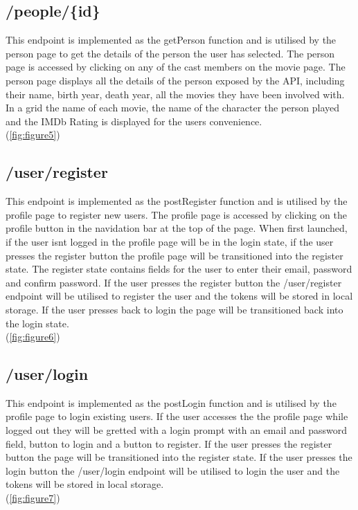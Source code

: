 \documentclass[12pt,a4paper]{article}
\begin{document}
		\subsection{/people/\{id\}}
			This endpoint is implemented as the getPerson function and is utilised by the person page 
			to get the details of the person the user has selected. The person page is accessed by 
			clicking on any of the cast members on the movie page. The person page displays all the 
			details of the person exposed by the API, including their name, birth year, death year, 
			all the movies they have been involved with. In a grid the name of each movie, the name 
			of the character the person played and the IMDb Rating is displayed for the users 
			convenience.\\
			(\cref{fig:figure5})

		\subsection{/user/register}
			This endpoint is implemented as the postRegister function and is utilised by the profile 
			page to register new users. The profile page is accessed by clicking on the profile button 
			in the navidation bar at the top of the page. When first launched, if the user isnt logged 
			in the profile page will be in the login state, if the user presses the register button the 
			profile page will be transitioned into the register state. The register state contains 
			fields for the user to enter their email, password and confirm password. If the user 
			presses the register button the /user/register endpoint will be utilised to register the 
			user and the tokens will be stored in local storage. If the user presses back to login the 
			page will be transitioned back into the login state.\\
			(\cref{fig:figure6})

		\subsection{/user/login}
			This endpoint is implemented as the postLogin function and is utilised by the profile page 
			to login existing users. If the user accesses the the profile page while logged out they 
			will be gretted with a login prompt with an email and password field, button to login and 
			a button to register. If the user presses the register button the page will be transitioned 
			into the register state. If the user presses the login button the /user/login endpoint will 
			be utilised to login the user and the tokens will be stored in local storage.\\
			(\cref{fig:figure7})
\end{document}
